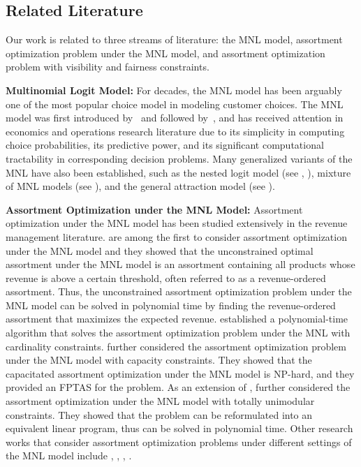 \documentclass[msom,non-blindrev]{informs3} %
\theoremstyle{definition}
\begin{document}
\subsection{Related Literature}

Our work is related to three streams of literature: the MNL model, assortment optimization problem under the MNL model, and assortment optimization problem with visibility and fairness constraints.

\noindent\textbf{Multinomial Logit Model:} For decades, the MNL model has been arguably one of the most popular choice model in modeling customer choices. The MNL model was first introduced by~\cite{luce1959individual} and followed by~\cite{mcfadden1972conditional}, and has received attention in economics and operations research literature due to its simplicity in computing choice probabilities, its predictive power, and its significant computational tractability in corresponding decision problems. Many generalized variants of the MNL have also been established, such as the nested logit model (see \citealt{williams1977formation}, \citealt{mcfadden1980econometric}), mixture of MNL models (see \citealt{mcfadden2000mixed}), and the general attraction model (see \citealt{gallego2015general}).

\noindent\textbf{Assortment Optimization under the MNL Model:} Assortment optimization under the MNL model has been studied extensively in the revenue management literature. \cite{talluri2004revenue} are among the first to consider assortment optimization under the MNL model and they showed that the unconstrained optimal assortment under the MNL model is an assortment containing all products whose revenue is above a certain threshold, often referred to as a revenue-ordered assortment. Thus, the unconstrained assortment optimization problem under the MNL model can be solved in polynomial time by finding the revenue-ordered assortment that maximizes the expected revenue. \cite{rusmevichientong2010dynamic} established a polynomial-time algorithm that solves the assortment optimization problem under the  MNL with cardinality constraints. \cite{desir2022capacitated} further considered the assortment optimization problem under the MNL model with capacity constraints. They showed that the capacitated assortment optimization under the MNL model is NP-hard, and they provided an FPTAS for the problem. As an extension of \cite{rusmevichientong2010dynamic}, \cite{sumida2021revenue} further considered the assortment optimization under the MNL model with totally unimodular constraints. They showed that the problem can be reformulated into an equivalent linear program, thus can be solved in polynomial time. Other research works that consider assortment optimization problems under different settings of the MNL model  include \cite{mahajan2001stocking}, \cite{gao2021assortment}, \cite{el2023joint}, \cite{housni2023maximum}.
\end{document}
